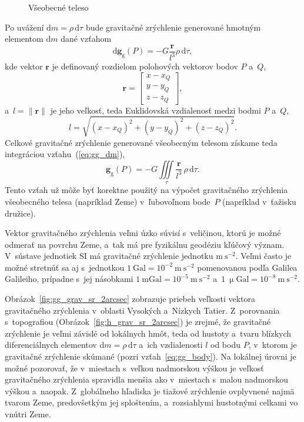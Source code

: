 \documentclass[a4paper,12pt]{book}
\newcommand{\diff}{\mathrm d}
\newcommand{\gidx}{\mathrm g}
\let\vec\mathbf
\begin{document}
\begin{figure}
\centering

\caption{Všeobecné teleso}
\label{fig:gravitating_body}
\end{figure}

Po uvážení $\diff m = \rho \, \diff \tau$ bude gravitačné zrýchlenie generované
hmotným elementom $\diff m$ dané vzťahom
%
\begin{equation}
\label{eq:gg_dm}
\diff \vec g_\gidx(P) = -G \frac{\vec r}{l^3} \rho \, \diff\tau{,}
\end{equation}
%
kde vektor $\vec r$ je definovaný rozdielom polohových vektorov bodov $P$
a~$Q$,
%
\begin{equation}
\label{eq:r}
\vec r =
%
\begin{bmatrix}
x - x_Q \\
y - y_Q \\
z - z_Q
\end{bmatrix}
{,}
\end{equation}
%
a~$l = \| \vec r \|$ je jeho veľkosť, teda Euklidovská vzdialenosť medzi bodmi
$P$ a~$Q$,
%
\begin{equation}
\label{eq:l}
l = \sqrt{(x - x_Q)^2 + (y - y_Q)^2 + (z - z_Q)^2}{.}
\end{equation}
%
Celkové gravitačné zrýchlenie generované všeobecným telesom získame teda
integráciou vzťahu~(\ref{eq:gg_dm}),
%
\begin{equation}
\label{eq:gg_body}
\vec g_\gidx(P) = -G \iiint\limits_{\tau} \frac{\vec r}{l^3} \, \rho \, 
\diff\tau{.}
\end{equation}
%
Tento vzťah už môže byť korektne použitý na výpočet gravitačného zrýchlenia 
všeobecného telesa (napríklad Zeme) v~ľubovoľnom bode~$P$ (napríklad v~ťažisku 
družice).

Vektor gravitačného zrýchlenia veľmi úzko súvisí s~veličinou, ktorú je možné
odmerať na povrchu Zeme, a~tak má pre fyzikálnu geodéziu kľúčový význam.
V~sústave jednotiek SI má gravitačné zrýchlenie jednotku $\mathrm{m}\
\mathrm{s}^{-2}$.  Veľmi často je možné stretnúť sa aj s~jednotkou $1\
\mathrm{Gal} = 10^{-2}\ \mathrm{m}\ \mathrm{s}^{-2}$ pomenovanou podľa Galilea
Galileiho, prípadne s~jej násobkami $1\ \mathrm{mGal} = 10^{-5}\ \mathrm{m}\
\mathrm{s}^{-2}$ a~$1\ \upmu \mathrm{Gal} = 10^{-8}\ \mathrm{m}\
\mathrm{s}^{-2}$.

Obrázok~\ref{fig:gg_grav_sr_2arcsec} zobrazuje priebeh veľkosti vektora
gravitačného zrýchlenia v~oblasti Vysokých a~Nízkych Tatier.  Z~porovnania
s~topografiou (Obrázok~\ref{fig:h_grav_sr_2arcsec}) je zrejmé, že gravitačné
zrýchlenie je veľmi závislé od lokálnych hmôt, teda od hustoty a~tvaru blízkych
diferenciálnych elementov $\diff m = \rho \, \diff \tau$ a~ich vzdialenosti $l$
od bodu $P$, v~ktorom je gravitačné zrýchlenie skúmané (pozri
vzťah~\ref{eq:gg_body}).  Na lokálnej úrovni je možné pozorovať, že v~miestach
s~veľkou nadmorskou výškou je veľkosť gravitačného zrýchlenia spravidla menšia
ako v~miestach s~malou nadmorskou výškou a~naopak.  Z~globálneho hľadiska je
tiažové zrýchlenie ovplyvnené najmä tvarom Zeme, predovšetkým jej sploštením,
a~rozsiahlymi hustotnými celkami vo vnútri Zeme.
\end{document}
